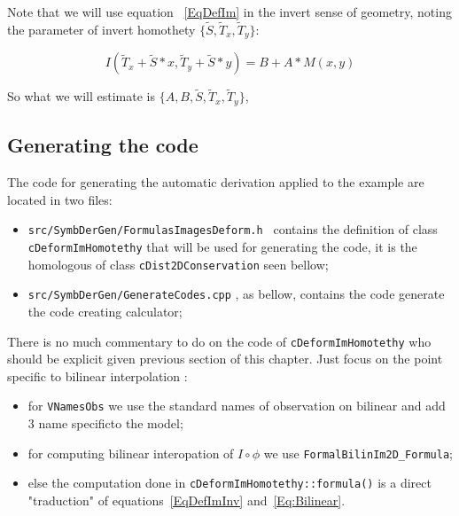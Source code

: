 Note that we will use equation ~\ref{EqDefIm} in the invert sense of geometry, noting
the parameter of invert homothety $\{\tilde{S},\tilde{T}_x,\tilde{T}_y\}$:

\begin{equation}
	I(\tilde{T}_x + \tilde{S}*x,\tilde{T}_y + \tilde{S}*y) =  B + A * M(x,y) \label{EqDefImInv}
\end{equation}

So what we will estimate is $\{A,B,\tilde{S},\tilde{T}_x,\tilde{T}_y\}$,


\subsection{Generating the code}

The code for generating the automatic derivation applied to the example are located in two files:

\begin{itemize}
    \item {\tt src/SymbDerGen/FormulasImagesDeform.h } contains the definition of  class 
              {\tt cDeformImHomotethy} that will be used for generating the code, it is the homologous
              of class  {\tt cDist2DConservation} seen bellow;

    \item {\tt src/SymbDerGen/GenerateCodes.cpp} , as bellow, contains the code generate the code
          creating calculator;

\end{itemize}

There is no much commentary to do on the code of {\tt cDeformImHomotethy} who
should be explicit given previous section of this chapter.
Just focus on the point specific to bilinear interpolation :

\begin{itemize}
	\item for {\tt VNamesObs} we use the standard names of observation on bilinear 
              and add $3$ name specificto the model;

      \item for computing bilinear interopation of $I \circ \phi$ we use {\tt FormalBilinIm2D\_Formula};

      \item else the computation done in {\tt cDeformImHomotethy::formula()} is a direct "traduction"
	      of equations~\ref{EqDefImInv} and~\ref{Eq:Bilinear}.

\end{itemize}


